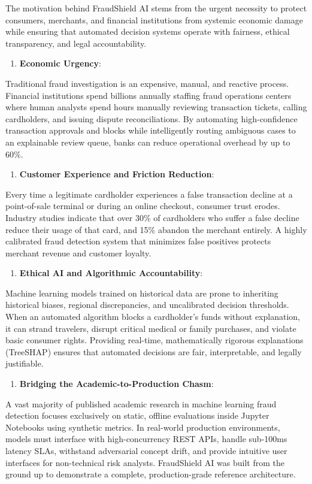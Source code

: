 \documentclass[12pt,a4paper,oneside]{report}
\begin{document}
The motivation behind FraudShield AI stems from the urgent necessity to protect consumers, merchants, and financial institutions from systemic economic damage while ensuring that automated decision systems operate with fairness, ethical transparency, and legal accountability.


\begin{enumerate}[leftmargin=0.35in]
\item \textbf{Economic Urgency}:
\end{enumerate}
Traditional fraud investigation is an expensive, manual, and reactive process. Financial institutions spend billions annually staffing fraud operations centers where human analysts spend hours manually reviewing transaction tickets, calling cardholders, and issuing dispute reconciliations. By automating high-confidence transaction approvals and blocks while intelligently routing ambiguous cases to an explainable review queue, banks can reduce operational overhead by up to 60\%.


\begin{enumerate}[leftmargin=0.35in]
\item \textbf{Customer Experience and Friction Reduction}:
\end{enumerate}
Every time a legitimate cardholder experiences a false transaction decline at a point-of-sale terminal or during an online checkout, consumer trust erodes. Industry studies indicate that over 30\% of cardholders who suffer a false decline reduce their usage of that card, and 15\% abandon the merchant entirely. A highly calibrated fraud detection system that minimizes false positives protects merchant revenue and customer loyalty.


\begin{enumerate}[leftmargin=0.35in]
\item \textbf{Ethical AI and Algorithmic Accountability}:
\end{enumerate}
Machine learning models trained on historical data are prone to inheriting historical biases, regional discrepancies, and uncalibrated decision thresholds. When an automated algorithm blocks a cardholder's funds without explanation, it can strand travelers, disrupt critical medical or family purchases, and violate basic consumer rights. Providing real-time, mathematically rigorous explanations (TreeSHAP) ensures that automated decisions are fair, interpretable, and legally justifiable.


\begin{enumerate}[leftmargin=0.35in]
\item \textbf{Bridging the Academic-to-Production Chasm}:
\end{enumerate}
A vast majority of published academic research in machine learning fraud detection focuses exclusively on static, offline evaluations inside Jupyter Notebooks using synthetic metrics. In real-world production environments, models must interface with high-concurrency REST APIs, handle sub-100ms latency SLAs, withstand adversarial concept drift, and provide intuitive user interfaces for non-technical risk analysts. FraudShield AI was built from the ground up to demonstrate a complete, production-grade reference architecture.
\end{document}
